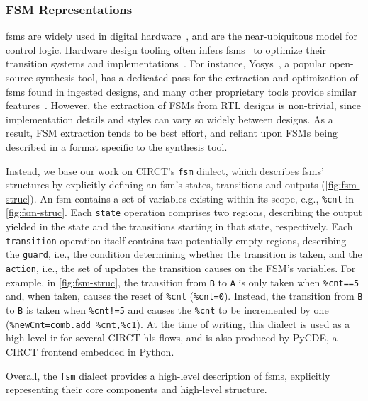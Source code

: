\documentclass[acmsmall,screen,review]{acmart}
\begin{document}
  
\subsubsection{FSM Representations}

\acp{fsm} are widely used in digital hardware~\cite{pedroni2013fsms}, and are the near-ubiquitous model for control logic.
Hardware design tooling often infers \acp{fsm}~\cite{giomi1995fsmextraction, shi2010fsmextraction, liu1998fsm} to optimize their transition systems and implementations~\cite{barkalov2021fsmdecomp, barkalov2024fsmreduct}.
For instance, Yosys~\cite{yosys}, a popular open-source synthesis tool, has a dedicated pass for the extraction and optimization of \acp{fsm} found in ingested designs, 
and many other proprietary tools provide similar features~\cite{vivadouserguide, iseguide}.
However, the extraction of FSMs from RTL designs is non-trivial, since implementation details and styles can vary so widely between designs.
As a result, FSM extraction tends to be best effort, and reliant upon FSMs being described in a format specific to the synthesis tool.

Instead, we base our work on CIRCT's \texttt{fsm} dialect, which describes \acp{fsm}' structures by explicitly defining an \ac{fsm}'s states, transitions and outputs (\autoref{fig:fsm-struc}).
An \ac{fsm} contains a set of variables existing within its scope, e.g., \texttt{\%cnt} in \autoref{fig:fsm-struc}. 
Each \texttt{state} operation comprises two regions, describing the output yielded in the state and the transitions starting in that state, respectively. 
Each \texttt{transition} operation itself contains two potentially empty regions, describing the \texttt{guard}, i.e., the condition determining whether the 
transition is taken, and the \texttt{action}, i.e., the set of updates the transition causes on the FSM's variables. 
For example, in \autoref{fig:fsm-struc}, the transition from \texttt{B} to \texttt{A} is only taken when \texttt{\%cnt==5} and, when taken, causes the reset of \texttt{\%cnt} (\texttt{\%cnt=0}).
Instead, the transition from \texttt{B} to \texttt{B} is taken when \texttt{\%cnt!=5} and causes the \texttt{\%cnt} to be incremented by one (\texttt{\%newCnt=comb.add \%cnt,\%c1}).
At the time of writing, this dialect is used as a high-level \ac{ir} for several CIRCT \ac{hls} flows, and is also produced by PyCDE, a CIRCT frontend embedded in Python.

Overall, the \texttt{fsm} dialect provides a high-level description of \acp{fsm}, explicitly representing their core components and high-level structure. 
\end{document}
